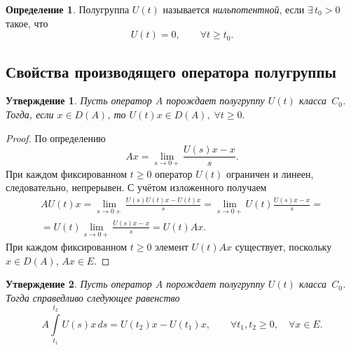 \documentclass{article}
\renewcommand{\ge}{\geqslant}
\newtheorem{statement}{Утверждение}
\theoremstyle{definition}
\newtheorem{definition}{Определение}
\begin{document}
\begin{definition} \label{nilpotent semigroup}
	Полугруппа $U(t)$ называется \textit{нильпотентной}, если \linebreak $\exists \, t_0 > 0$ такое, что
	\begin{equation*}
		U(t) = 0, \qquad \forall t \ge t_0.
	\end{equation*}
\end{definition}
\subsection{Свойства производящего оператора полугруппы} \label{Generator}
\theoremstyle{definition}
\begin{statement} \label{U(t)x in D(A)}
	Пусть оператор $A$ порождает полугруппу $U(t)$ класса~$C_0$. Тогда,
	если $ x \in D(A) $, то $ U(t)x \in D(A), \; \forall t \ge 0. $
\end{statement}
\begin{proof}
	По определению
	\begin{equation*}
		Ax = \lim\limits_{s \rightarrow 0+} \frac{U(s)x - x}{s}.
	\end{equation*}
	При каждом фиксированном $t \ge 0$ оператор $U(t)$ ограничен и линеен, следовательно, непрерывен. С учётом изложенного получаем
	\begin{gather*}
		AU(t)x = \lim\limits_{s \rightarrow 0+} \frac{U(s)U(t)x - U(t)x}{s} = 
		\lim\limits_{s \rightarrow 0+} U(t)\frac{U(s)x - x}{s} = \\[3mm]
		= U(t)\lim\limits_{s \rightarrow 0+} \frac{U(s)x - x}{s} = U(t)Ax.
	\end{gather*}
	При каждом фиксированном $t \ge 0$ элемент $U(t)Ax$ существует, поскольку $x \in D(A)$, $Ax \in E$.
\end{proof}

\begin{statement} \label{A = d/dx}
	Пусть оператор $A$ порождает полугруппу $U(t)$ класса~$C_0$. Тогда 
	справедливо следующее равенство
	\begin{equation} \label{integral identity}
		A \int\limits_{t_1}^{t_2} U(s)x\,ds = U(t_2)x - U(t_1)x, \qquad \forall t_1, t_2 \ge 0, \quad \forall x \in E.
	\end{equation}
\end{statement}
\end{document}
